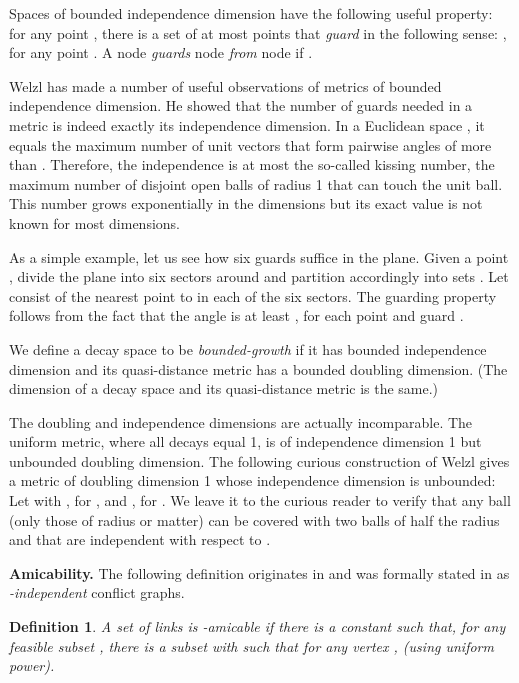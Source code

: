 \documentclass[11pt]{amsart}
\newtheorem{definition}{Definition}[section]
\newcommand{\define}[1]{\emph{#1}} \newcommand{\degree}{^\circ}
\newcommand{\mypara}[1]{\smallskip\noindent\textbf{#1.}}  \newcommand{\tightpara}[1]{\noindent\textbf{#1.}}  \newcommand{\inddim}{D}
\begin{document}
Spaces of bounded independence dimension  have the following
useful property: for any point , there is a set  of at most  points that \emph{guard}  in the following
sense: , for any point . A node  \emph{guards} node  \emph{from} node  if
.

Welzl \cite{Welzl08} has made a number of useful observations of
metrics of bounded independence dimension. He showed that the number of guards needed in a
metric is indeed exactly its independence dimension. In a Euclidean
space , it equals the maximum number of unit vectors
that form pairwise angles of more than .
Therefore, the independence is at most the so-called kissing number,
the maximum number of disjoint open balls of radius 1 that can touch
the unit ball. This number grows exponentially in the dimensions but
its exact value is not known for most dimensions.

As a simple example, let us see how six guards suffice in the plane.
Given a point , divide the plane into six  sectors around 
and partition  accordingly into sets .
Let  consist of the nearest point to  in each of the six sectors.
The guarding property follows from the fact that the angle  is at least , for each point  and guard .

We define a decay space to be \emph{bounded-growth} if it has bounded
independence dimension and its quasi-distance metric has a bounded
doubling dimension.  (The dimension of a decay space and its
quasi-distance metric is the same.)

The doubling and independence dimensions are actually incomparable.
The uniform metric, where all decays equal 1, is of independence
dimension 1 but unbounded doubling dimension.
The following curious construction of Welzl \cite{Welzl08} gives a
metric of doubling dimension 1 whose independence dimension is unbounded:
Let  with
, for , and , for . We leave it to the curious reader to
verify that any ball (only those of radius  or 
matter) can be covered with two balls of half the radius and that  are independent with respect to .

\mypara{Amicability}
The following definition originates in \cite{infocom11} and 
was formally stated in \cite{dams2013sleeping} as \emph{-independent} conflict graphs.

\begin{definition}
A set  of links is \define{-amicable} if there is a constant  such that, for
any feasible subset , there is a subset  with  such that for any vertex ,  (using uniform power).
\end{definition}
\end{document}
